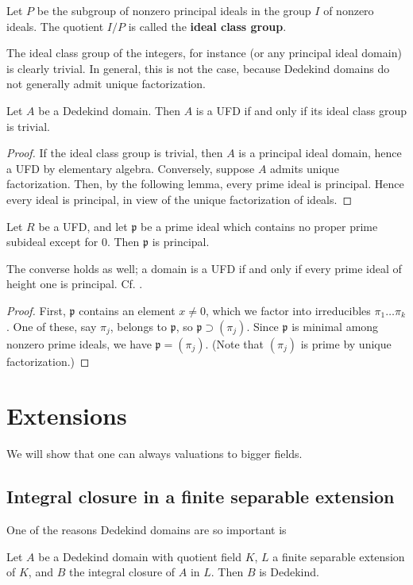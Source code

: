 \begin{definition} Let $P$ be the subgroup of nonzero principal ideals in the group $I$ of nonzero ideals.  The quotient $I/P$ is called the \textbf{ideal class group}.
\end{definition}

The ideal class group of the integers, for instance (or any principal ideal domain) is clearly trivial.  In general, this is not the case, because Dedekind domains do not generally admit unique factorization.
\begin{proposition} Let $A$ be a Dedekind domain. Then $A$ is a UFD if and only if its ideal class group is trivial.
\end{proposition}
\begin{proof} If the ideal class group is trivial, then $A$ is a principal ideal domain, hence a UFD by elementary algebra.  Conversely, suppose $A$ admits unique factorization.  
Then, by the following lemma, every prime ideal is principal.  Hence every ideal is principal, in view of the unique factorization of ideals.
\end{proof}
\begin{lemma} Let $R$ be a UFD, and let $\mathfrak{p}$ be a prime ideal which contains no proper prime subideal except for $0$.  Then $\mathfrak{p}$ is principal.
\end{lemma}
The converse holds as well; a domain is a UFD if and only if every prime ideal
of height one is principal.  Cf. \cite{Ei95}.
\begin{proof}
First, $\mathfrak{p}$ contains an element $x \neq 0$, which we factor into irreducibles $\pi_1 \dots \pi_k$.  One of these, say $\pi_j$, belongs to $\mathfrak{p}$, so $\mathfrak{p} \supset (\pi_j)$. Since $\mathfrak{p}$ is minimal among nonzero prime ideals, we have $\mathfrak{p} = (\pi_j)$.  (Note that $(\pi_j)$ is prime by unique factorization.)
\end{proof}

\section{Extensions}

We will show that one can always   valuations to bigger fields.  
\subsection{Integral closure in a finite separable extension}

One of the reasons Dedekind domains are so important is
\begin{theorem} \label{intclosdedekind} Let $A$ be a Dedekind domain with quotient field $K$, $L$ a finite separable extension of $K$, and $B$ the integral closure of $A$ in $L$.  Then $B$ is Dedekind.
\end{theorem}

